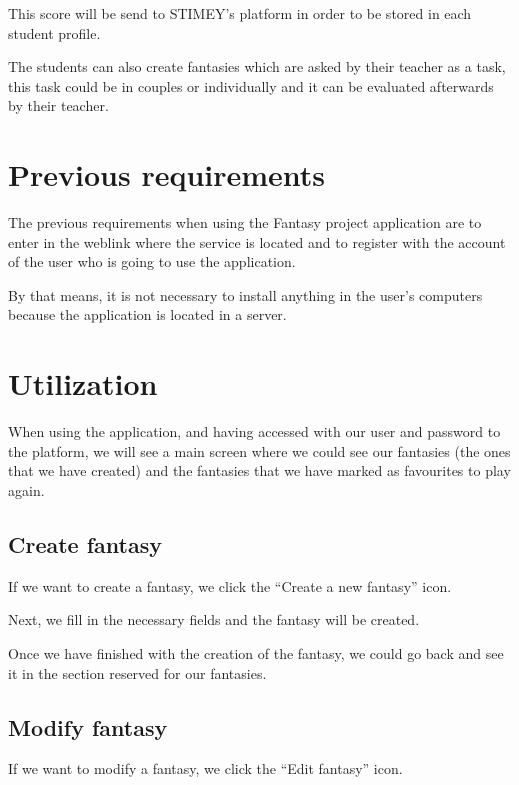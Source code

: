 \documentclass{book}
\begin{document}
This score will be send to STIMEY's platform in order to be stored in each student profile. 


The students can also create fantasies which are asked by their teacher as a task, this task could be in couples or individually and it can be evaluated afterwards by their teacher.


\section{Previous requirements}
The previous requirements when using the Fantasy project application are to enter in the weblink where the service is located and to register with the account of the user who is going to use the application.


By that means, it is not necessary to install anything in the user's computers because the application is located in a server.


\section{Utilization}
When using the application, and having accessed with our user and password to the platform, we will see a main screen where we could see our fantasies (the ones that we have created) and the fantasies that we have marked as favourites to play again.

\subsection{Create fantasy}
If we want to create a fantasy, we click the ``Create a new fantasy'' icon.



Next, we fill in the necessary fields and the fantasy will be created.


Once we have finished with the creation of the fantasy, we could go back and see it in the section reserved for our fantasies.

\subsection{Modify fantasy}
If we want to modify a fantasy, we click the ``Edit fantasy'' icon.


\end{document}

